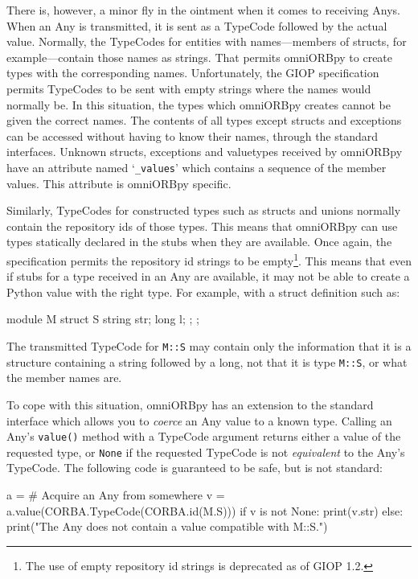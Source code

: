 \documentclass[11pt,oneside,a4paper]{book}
\newcommand{\type}[1]{\texttt{#1}}
\newcommand{\code}[1]{\texttt{#1}}
\newcommand{\op}[1]{\texttt{#1()}}
\newcommand{\term}[1]{\textit{#1}}
\begin{document}
There is, however, a minor fly in the ointment when it comes to
receiving Anys. When an Any is transmitted, it is sent as a TypeCode
followed by the actual value.  Normally, the TypeCodes for entities
with names---members of structs, for example---contain those names as
strings. That permits omniORBpy to create types with the corresponding
names. Unfortunately, the GIOP specification permits TypeCodes to be
sent with empty strings where the names would normally be. In this
situation, the types which omniORBpy creates cannot be given the
correct names. The contents of all types except structs and exceptions
can be accessed without having to know their names, through the
standard interfaces. Unknown structs, exceptions and valuetypes
received by omniORBpy have an attribute named `\code{\_values}' which
contains a sequence of the member values. This attribute is omniORBpy
specific.

Similarly, TypeCodes for constructed types such as structs and unions
normally contain the repository ids of those types. This means that
omniORBpy can use types statically declared in the stubs when they are
available. Once again, the specification permits the repository id
strings to be empty\footnote{The use of empty repository id strings is
deprecated as of GIOP 1.2.}. This means that even if stubs for a type
received in an Any are available, it may not be able to create a
Python value with the right type. For example, with a struct
definition such as:

\begin{idllisting}
module M {
  struct S {
    string str;
    long   l;
  };
};
\end{idllisting}

\noindent The transmitted TypeCode for \type{M::S} may contain only
the information that it is a structure containing a string followed by
a long, not that it is type \type{M::S}, or what the member names are.

To cope with this situation, omniORBpy has an extension to the
standard interface which allows you to \term{coerce} an Any value to a
known type. Calling an Any's \op{value} method with a TypeCode
argument returns either a value of the requested type, or \code{None}
if the requested TypeCode is not \term{equivalent} to the Any's
TypeCode. The following code is guaranteed to be safe, but is not
standard:

\begin{pylisting}
a = # Acquire an Any from somewhere
v = a.value(CORBA.TypeCode(CORBA.id(M.S)))
if v is not None:
    print(v.str)
else:
    print("The Any does not contain a value compatible with M::S.")
\end{pylisting}
\end{document}
